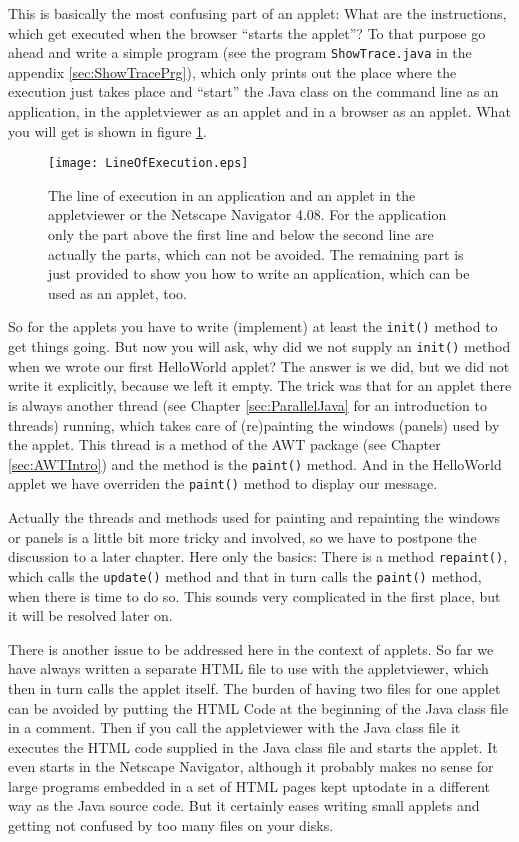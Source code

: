 This is basically the most confusing part of an applet: What are the
instructions, which get executed when the browser ``starts the applet''?
To that purpose go ahead and write a simple program 
(see the program \verb|ShowTrace.java| in the appendix \ref{sec:ShowTracePrg}),
 which only 
prints out the place where the execution just takes place and ``start''
the Java class on the command line as an application, in the appletviewer
as an applet and in a browser as an applet. What you will get is shown
in figure \ref{fig:LineOfExecution}.
\begin{figure}[htbp]
  \begin{center}
    \leavevmode
    \texttt{[image: LineOfExecution.eps]}
    \caption{The line of execution in an application and an applet in
        the appletviewer or the Netscape Navigator 4.08. For the application
        only the part above the first line and below the second line are
        actually the parts, which can not be avoided. The remaining
        part is just provided to show you how to write an application,
        which can be used as an applet, too.}
    \label{fig:LineOfExecution}
  \end{center}
\end{figure}

So for the applets you have to write (implement) at least the 
\verb|init()| method to get things going. But now you will ask, why did we
not supply an  \verb|init()| method when we wrote our first 
HelloWorld applet? The answer is we did, but we did not write it explicitly,
because we left it empty. The trick was that for an applet there is
always another thread (see 
Chapter \ref{sec:ParallelJava} for an introduction to threads)
running, which takes care of (re)painting the windows (panels) used by the applet.
This thread is a method of the AWT package (see Chapter \ref{sec:AWTIntro}) and
the method is the \verb|paint()| method. And in the    HelloWorld applet
we have overriden the \verb|paint()| method to display our message.

Actually the threads and methods used for painting and repainting
the windows or panels is a little bit more tricky and involved, so we
have to postpone the discussion to a later chapter. Here only the basics:
There is a method \verb|repaint()|, which calls the \verb|update()|
method and that in turn calls the \verb|paint()| method, when there is time
to do so. This sounds very complicated in the first place, but 
it will be resolved later on.

There is another issue to be addressed here in the context of applets.
So far we have always written a separate HTML file to use with the
appletviewer, which then in turn calls the applet itself. The burden
of having two files for one applet can be avoided by putting the
HTML Code at the beginning of the Java class file in a comment. Then
if you call the appletviewer with the Java class file 
it executes the HTML code supplied
in the Java class file and starts the applet. It even starts in
the Netscape Navigator, although it probably makes no sense for
large programs embedded in a set of HTML pages kept uptodate in a
different way as the Java source code. But it certainly eases
writing small applets and getting not confused by too many files on
your disks. 

